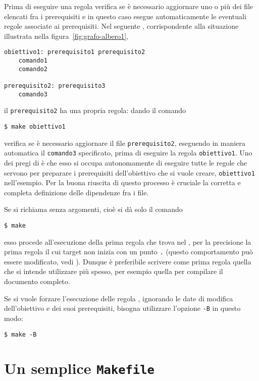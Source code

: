 Prima di eseguire una regola  verifica se è necessario
aggiornare uno o più dei file elencati fra i prerequisiti e in questo caso
esegue automaticamente le eventuali regole associate ai prerequisiti.  Nel
seguente , corrispondente alla situazione illustrata nella
figura~\ref{fig:grafo-albero1},
\begin{lstlisting}
obiettivo1: prerequisito1 prerequisito2
	comando1
	comando2

prerequisito2: prerequisito3
	comando3
\end{lstlisting}
il \texttt{prerequisito2} ha una propria regola: dando il comando
\begin{verbatim}
$ make obiettivo1
\end{verbatim}
 verifica se è necessario aggiornare il file
\texttt{prerequisito2}, eseguendo in maniera automatica il \texttt{comando3}
specificato, prima di eseguire la regola \texttt{obiettivo1}.  Uno dei pregi di
 è che esso si occupa autonomamente di eseguire tutte le regole
che servono per preparare i prerequisiti dell'obiettivo che si vuole creare,
\texttt{obiettivo1} nell'esempio.  Per la buona riuscita di questo processo è
cruciale la corretta e completa definizione delle dipendenze fra i file.

Se si richiama  senza argomenti, cioè si dà solo il comando
\begin{verbatim}
$ make
\end{verbatim}
esso procede all'esecuzione della prima regola che trova nel
, per la precisione la prima regola il cui target non inizia
con un punto \texttt{.}  (questo comportamento può essere modificato, vedi
\cite[pagina 5]{gnu:make}).  Dunque è preferibile scrivere come prima regola
quella che si intende utilizzare più spesso, per esempio quella per compilare il
documento completo.

Se si vuole forzare l'esecuzione delle regola , ignorando le
date di modifica dell'obiettivo e dei suoi prerequisiti, bisogna utilizzare
l'opzione \texttt{-B} in questo modo:
\begin{sintassi}
  \small \texttt{\$ make -B} 
\end{sintassi}

\section{Un semplice \texttt{Makefile}}
\label{sec:makefile-semplice}

